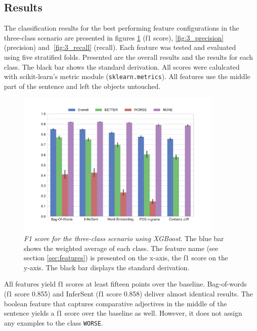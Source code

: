 \subsection{Results}
\label{sec:3_results}
The classification results for the best performing feature configurations in the three-class scenario are presented in figures \ref{fig:3_f1} (f1 score), \ref{fig:3_precision} (precision) and \ref{fig:3_recall} (recall). Each feature was tested and evaluated using five stratified folds. Presented are the overall results and the results for each class. The black bar shows the standard derivation. All scores were calulcated with scikit-learn's metric module (\texttt{sklearn.metrics}). All features use the middle part of the sentence and left the objects untouched.


\begin{figure}[h]
      \caption{\emph{F1 score for the three-class scenario using XGBoost}. The blue bar shows the weighted average of each class. The feature name (see section \ref{sec:features}) is presented on the x-axis, the f1 score on the y-axis. The black bar displays the standard derivation.} 
    \label{fig:3_f1}
 \centering
	\includegraphics[width=0.9\textwidth]{images/experiments/f1-False}

\end{figure}

All features yield f1 scores at least fifteen points over the baseline. Bag-of-words (f1 score 0.855) and InferSent (f1 score 0.858) deliver almost identical results. The boolean feature that captures comparative adjectives in the middle of the sentence yields a f1 score over the baseline as well. However, it does not assign any examples to the class \texttt{WORSE}.



